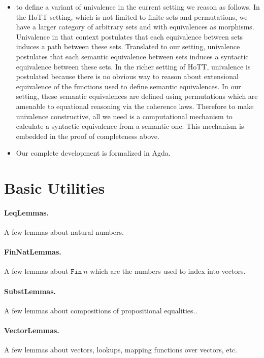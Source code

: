 \documentclass{article}
\begin{document}
\begin{itemize}
\item to define a variant of univalence in the current setting we
  reason as follows. In the HoTT setting, which is not limited to
  finite sets and permutations, we have a larger category of arbitrary
  sets and with equivalences as morphisms. Univalence in that context
  postulates that each equivalence between sets induces a path between
  these sets. Translated to our setting, univalence postulates that
  each semantic equivalence between sets induces a syntactic
  equivalence between these sets. In the richer setting of HoTT,
  univalence is postulated because there is no obvious way to reason
  about extensional equivalence of the functions used to define
  semantic equivalences. In our setting, these semantic equivalences
  are defined using permutations which are amenable to equational
  reasoning via the coherence laws. Therefore to make univalence
  constructive, all we need is a computational mechanism to calculate
  a syntactic equivalence from a semantic one. This mechanism is
  embedded in the proof of completeness above. 

\item Our complete development is formalized in Agda. 
\end{itemize}

\section{Basic Utilities}

\paragraph*{LeqLemmas.} A few lemmas about natural numbers. 

\paragraph*{FinNatLemmas.} A few lemmas about $\texttt{Fin}~n$ which
are the numbers used to index into vectors.

\paragraph*{SubstLemmas.} A few lemmas about compositions of
propositional equalities..

\paragraph*{VectorLemmas.} A few lemmas about vectors, lookups,
mapping functions over vectors, etc.
\end{document}
